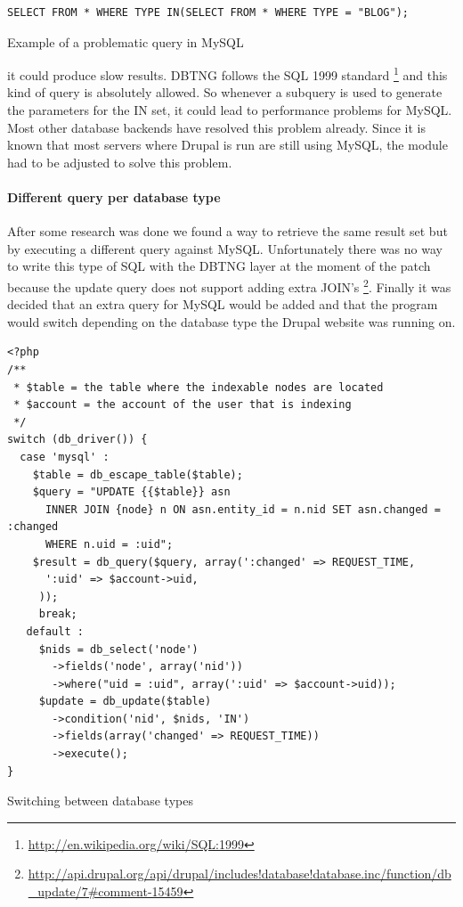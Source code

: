 \begin{verbatim}
SELECT FROM * WHERE TYPE IN(SELECT FROM * WHERE TYPE = "BLOG");
\end{verbatim}
\caption{Example of a problematic query in MySQL}

it could produce slow results. DBTNG follows the SQL 1999 standard \footnote{\url{http://en.wikipedia.org/wiki/SQL:1999}} and this kind of query is absolutely allowed. So whenever a subquery is used to generate the parameters for the IN set, it could lead to performance problems for MySQL. Most other database backends have resolved this problem already. Since it is known that most servers where Drupal is run are still using MySQL, the module had to be adjusted to solve this problem. 

\paragraph{Different query per database type} After some research was done we found a way to retrieve the same result set but by executing a different query against MySQL. Unfortunately there was no way to write this type of SQL with the DBTNG layer at the moment of the patch because the update query does not support adding extra JOIN's \footnote{\url{http://api.drupal.org/api/drupal/includes!database!database.inc/function/db_update/7\#comment-15459}}. Finally it was decided that an extra query for MySQL would be added and that the program would switch depending on the database type the Drupal website was running on.

\begin{verbatim}
<?php
/**
 * $table = the table where the indexable nodes are located
 * $account = the account of the user that is indexing
 */
switch (db_driver()) {
  case 'mysql' :
    $table = db_escape_table($table);
    $query = "UPDATE {{$table}} asn
      INNER JOIN {node} n ON asn.entity_id = n.nid SET asn.changed = :changed
      WHERE n.uid = :uid";
    $result = db_query($query, array(':changed' => REQUEST_TIME, 
      ':uid' => $account->uid,
     ));
     break;
   default :
     $nids = db_select('node')
       ->fields('node', array('nid'))
       ->where("uid = :uid", array(':uid' => $account->uid));
     $update = db_update($table)
       ->condition('nid', $nids, 'IN')
       ->fields(array('changed' => REQUEST_TIME))
       ->execute();
}
\end{verbatim}
\caption{Switching between database types}



